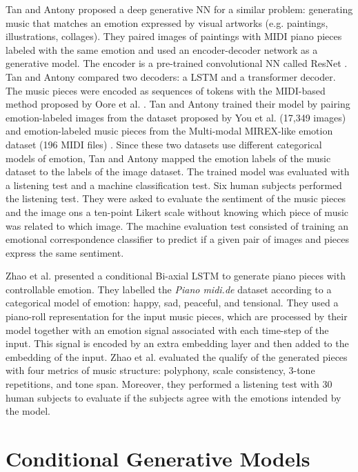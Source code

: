Tan and Antony \cite{tan2020automated} proposed a deep generative NN for a similar problem: generating music that matches an emotion expressed by visual artworks (e.g. paintings, illustrations, collages). They paired images of paintings with MIDI piano pieces labeled with the same emotion and used an encoder-decoder network as a generative model. The encoder is a pre-trained convolutional NN called ResNet \cite{}. Tan and Antony \cite{tan2020automated} compared two decoders: a LSTM and a transformer decoder.
The music pieces were encoded as sequences of tokens with the MIDI-based method proposed by Oore et al. \cite{oore2017learning}. Tan and Antony \cite{tan2020automated} trained their model by pairing emotion-labeled images from the dataset proposed by You et al. \cite{you2016building} (17,349 images) and emotion-labeled music pieces from the Multi-modal MIREX-like emotion dataset (196 MIDI files) \cite{panda2013multi}. Since these two datasets use different categorical models of emotion, Tan and Antony \cite{tan2020automated} mapped the emotion labels of the music dataset to the labels of the image dataset. The trained model was evaluated with a listening test and a machine classification test. Six human subjects performed the listening test. They were asked to evaluate the sentiment of the music pieces and the image ons a ten-point Likert scale without knowing which piece of music was related to which image. The machine evaluation test consisted of training an emotional correspondence classifier to predict if a given pair of images and pieces express the same sentiment.

Zhao et al. \cite{zhao2019emotional} presented a conditional Bi-axial LSTM \cite{} to generate piano pieces with controllable emotion. They labelled the \textit{Piano midi.de} dataset according to a categorical model of emotion: happy, sad, peaceful, and tensional. They used a piano-roll representation for the input music pieces, which are processed by their model together with an emotion signal associated with each time-step of the input. This signal is encoded by an extra embedding layer and then added to the embedding of the input. Zhao et al. \cite{zhao2019emotional} evaluated the qualify of the generated pieces with four metrics of music structure: polyphony, scale consistency, 3-tone repetitions, and tone span. Moreover, they performed a listening test with 30 human subjects to evaluate if the subjects agree with the emotions intended by the model.

\section{Conditional Generative Models}

